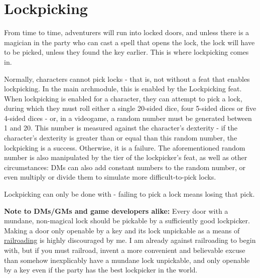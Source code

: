 \section{Lockpicking}
From time to time, adventurers will run into locked doors, and unless there is a magician in the party who can cast a spell that opens the lock, the lock will have to be picked, unless they found the key earlier. This is where lockpicking comes in.

Normally, characters cannot pick locks - that is, not without a feat that enables lockpicking. In the main archmodule, this is enabled by the Lockpicking feat. When lockpicking is enabled for a character, they can attempt to pick a lock, during which they must roll either a single 20-sided dice, four 5-sided dices or five 4-sided dices - or, in a videogame, a random number must be generated between 1 and 20. This number is measured against the character's dexterity - if the character's dexterity is greater than or equal than this random number, the lockpicking is a success. Otherwise, it is a failure. The aforementioned random number is also manipulated by the tier of the lockpicker's feat, as well as other circumstances: DMs can also add constant numbers to  the random number, or even multiply or divide them to simulate more difficult-to-pick locks.

Lockpicking can only be done with  - failing to pick a lock means losing that pick.

\small{\textbf{Note to DMs/GMs and game developers alike:} Every door with a mundane, non-magical lock should be pickable by a sufficiently good lockpicker. Making a door only openable by a key and its lock unpickable as a means of \href{https://tvtropes.org/pmwiki/pmwiki.php/Main/Railroading}{railroading} is highly discouraged by me. I am already against railroading to begin with, but if you must railroad, invent a more convenient and believable excuse than somehow inexplicably have a mundane lock unpickable, and only openable by a key even if the party has the best lockpicker in the world.}
